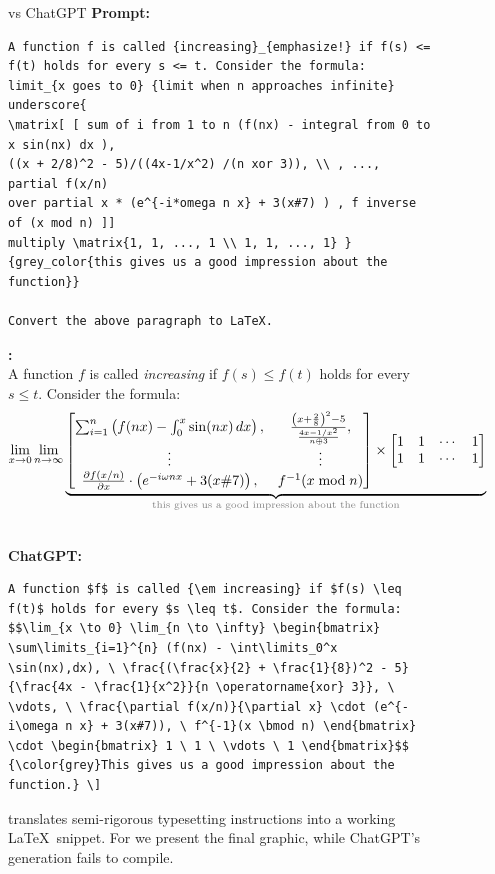 \begin{figure}[H]
\begin{AIbox}{\DV vs ChatGPT}
{\bf Prompt:}
\begin{verbatim}
A function f is called {increasing}_{emphasize!} if f(s) <= f(t) holds for every s <= t. Consider the formula:
limit_{x goes to 0} {limit when n approaches infinite} underscore{ 
\matrix[ [ sum of i from 1 to n (f(nx) - integral from 0 to x sin(nx) dx ),  
((x + 2/8)^2 - 5)/((4x-1/x^2) /(n xor 3)), \\ , ..., partial f(x/n)
over partial x * (e^{-i*omega n x} + 3(x#7) ) , f inverse of (x mod n) ]]
multiply \matrix{1, 1, ..., 1 \\ 1, 1, ..., 1} }
{grey_color{this gives us a good impression about the function}}

Convert the above paragraph to LaTeX.
\end{verbatim}

\parbox[t]{\linewidth}{{\bf \DV:}\\\scriptsize
A function $f$ is called \emph{increasing} if $f(s) \leq f(t)$ holds for every $s \leq t$. Consider the formula:
\[
\lim_{x \to 0} \lim_{n \to \infty} \underbrace{ \begin{bmatrix} \sum_{i = 1}^n \left(f(nx) - \int_0^x \sin(nx) \, dx \right), & \frac{\left(x + \frac{2}{8}\right)^2 - 5}{\frac{4x-1/x^2}{n \oplus 3}}, \\ \vdots & \vdots \\ \frac{\partial f(x/n)}{\partial x} \cdot  \left(e^{-i \omega n x} + 3(x\#7) \right), & f^{-1} (x \bmod n) \end{bmatrix}  \times  \begin{bmatrix} 1 & 1 & \cdots & 1 \\ 1 & 1 & \cdots & 1 \end{bmatrix} }_{\textcolor{gray}{\text{this gives us a good impression about the function}}}
\]}\\
{\bf ChatGPT:}
\begin{verbatim}
A function $f$ is called {\em increasing} if $f(s) \leq f(t)$ holds for every $s \leq t$. Consider the formula:
$$\lim_{x \to 0} \lim_{n \to \infty} \begin{bmatrix} \sum\limits_{i=1}^{n} (f(nx) - \int\limits_0^x \sin(nx),dx), \ \frac{(\frac{x}{2} + \frac{1}{8})^2 - 5}{\frac{4x - \frac{1}{x^2}}{n \operatorname{xor} 3}}, \ \vdots, \ \frac{\partial f(x/n)}{\partial x} \cdot (e^{-i\omega n x} + 3(x#7)), \ f^{-1}(x \bmod n) \end{bmatrix} \cdot \begin{bmatrix} 1 \ 1 \ \vdots \ 1 \end{bmatrix}$$
{\color{grey}This gives us a good impression about the function.} \]
\end{verbatim}
\end{AIbox}
\caption{\DV translates semi-rigorous typesetting instructions into a working \LaTeX\ snippet. For \DV we present the final graphic, while ChatGPT's generation fails to compile. }
\label{fig:code-LaTeX}
\end{figure}

